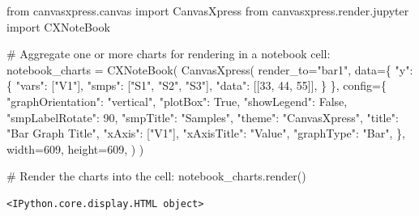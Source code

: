 \documentclass[
  letterpaper,
  DIV=11,
  numbers=noendperiod]{scrartcl}
\newenvironment{Shaded}{\begin{snugshade}}{\end{snugshade}}
\newcommand{\CommentTok}[1]{\textcolor[rgb]{0.37,0.37,0.37}{#1}}
\newcommand{\DecValTok}[1]{\textcolor[rgb]{0.68,0.00,0.00}{#1}}
\newcommand{\ImportTok}[1]{\textcolor[rgb]{0.00,0.46,0.62}{#1}}
\newcommand{\NormalTok}[1]{\textcolor[rgb]{0.00,0.23,0.31}{#1}}
\newcommand{\OperatorTok}[1]{\textcolor[rgb]{0.37,0.37,0.37}{#1}}
\newcommand{\StringTok}[1]{\textcolor[rgb]{0.13,0.47,0.30}{#1}}
\newcommand{\VariableTok}[1]{\textcolor[rgb]{0.07,0.07,0.07}{#1}}
\begin{document}
\begin{Shaded}
\begin{Highlighting}[]
\ImportTok{from}\NormalTok{ canvasxpress.canvas }\ImportTok{import}\NormalTok{ CanvasXpress}
\ImportTok{from}\NormalTok{ canvasxpress.render.jupyter }\ImportTok{import}\NormalTok{ CXNoteBook}

\CommentTok{\# Aggregate one or more charts for rendering in a notebook cell:}
\NormalTok{notebook\_charts }\OperatorTok{=}\NormalTok{ CXNoteBook(}
\NormalTok{    CanvasXpress(}
\NormalTok{        render\_to}\OperatorTok{=}\StringTok{"bar1"}\NormalTok{,}
\NormalTok{        data}\OperatorTok{=}\NormalTok{\{}
            \StringTok{"y"}\NormalTok{: \{}
                \StringTok{"vars"}\NormalTok{: [}\StringTok{"V1"}\NormalTok{],}
                \StringTok{"smps"}\NormalTok{: [}\StringTok{"S1"}\NormalTok{, }\StringTok{"S2"}\NormalTok{, }\StringTok{"S3"}\NormalTok{],}
                \StringTok{"data"}\NormalTok{: [[}\DecValTok{33}\NormalTok{, }\DecValTok{44}\NormalTok{, }\DecValTok{55}\NormalTok{]],}
\NormalTok{            \}}
\NormalTok{        \},}
\NormalTok{        config}\OperatorTok{=}\NormalTok{\{}
            \StringTok{"graphOrientation"}\NormalTok{: }\StringTok{"vertical"}\NormalTok{,}
            \StringTok{"plotBox"}\NormalTok{: }\VariableTok{True}\NormalTok{,}
            \StringTok{"showLegend"}\NormalTok{: }\VariableTok{False}\NormalTok{,}
            \StringTok{"smpLabelRotate"}\NormalTok{: }\DecValTok{90}\NormalTok{,}
            \StringTok{"smpTitle"}\NormalTok{: }\StringTok{"Samples"}\NormalTok{,}
            \StringTok{"theme"}\NormalTok{: }\StringTok{"CanvasXpress"}\NormalTok{,}
            \StringTok{"title"}\NormalTok{: }\StringTok{"Bar Graph Title"}\NormalTok{,}
            \StringTok{"xAxis"}\NormalTok{: [}\StringTok{"V1"}\NormalTok{],}
            \StringTok{"xAxisTitle"}\NormalTok{: }\StringTok{"Value"}\NormalTok{,}
            \StringTok{"graphType"}\NormalTok{: }\StringTok{"Bar"}\NormalTok{,}
\NormalTok{        \},}
\NormalTok{        width}\OperatorTok{=}\DecValTok{609}\NormalTok{,}
\NormalTok{        height}\OperatorTok{=}\DecValTok{609}\NormalTok{,}
\NormalTok{    )   }
\NormalTok{)}

\CommentTok{\# Render the charts into the cell:}
\NormalTok{notebook\_charts.render()}
\end{Highlighting}
\end{Shaded}

\begin{verbatim}
<IPython.core.display.HTML object>
\end{verbatim}
\end{document}
